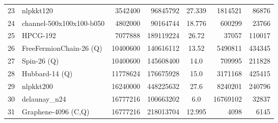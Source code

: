 \begin{tabular}{|l|l|r|r|S[round-mode=places,round-precision=2]|r|r|}
{23}& {nlpkkt120}	& 3542400	& 96845792	& 27.339	& 1814521	& 86876	\\
{24}& {channel-500x100x100-b050}	& 4802000	& 90164744	& 18.776	& 600299	& 23766	\\
{25}& {HPCG-192}	& 7077888	& 189119224	& 26.72	& 37057	& 110017	\\
{26}& {FreeFermionChain-26 (Q)}	& 10400600	& 140616112	& 13.52	& 5490811	& 434345	\\
{27}& {Spin-26 (Q)}	& 10400600	& 145608400	& 14.0	& 709995	& 211828	\\
{28}& {Hubbard-14 (Q)}	& 11778624	& 176675928	& 15.0	& 3171168	& 425415	\\
{29}& {nlpkkt200}	& 16240000	& 448225632	& 27.6	& 8240201	& 240796	\\
{30}& {delaunay\_n24}	& 16777216	& 100663202	& 6.0	& 16769102	& 32837	\\
{31}& {Graphene-4096 (C,Q)}	& 16777216	& 218013704	& 12.995	& 4098	& 6145	\\
\bottomrule
\end{tabular}


